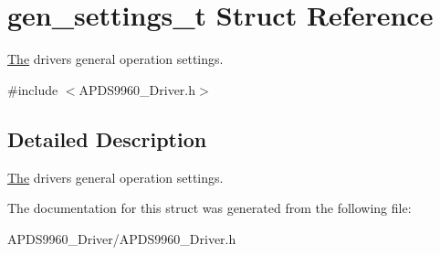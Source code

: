 \hypertarget{structgen__settings__t}{}\section{gen\+\_\+settings\+\_\+t Struct Reference}
\label{structgen__settings__t}


\hyperlink{structThe}{The} driver\textquotesingle{}s general operation settings.  




{\ttfamily \#include $<$A\+P\+D\+S9960\+\_\+\+Driver.\+h$>$}



\subsection{Detailed Description}
\hyperlink{structThe}{The} driver\textquotesingle{}s general operation settings. 

The documentation for this struct was generated from the following file\+:\begin{DoxyCompactItemize}
\item 
A\+P\+D\+S9960\+\_\+\+Driver/A\+P\+D\+S9960\+\_\+\+Driver.\+h\end{DoxyCompactItemize}
